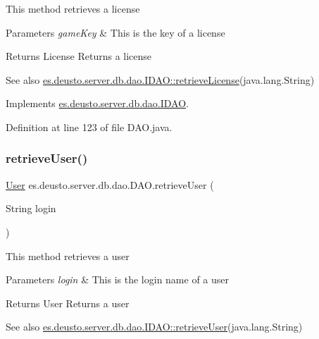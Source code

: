 This method retrieves a license 
\begin{DoxyParams}{Parameters}
{\em game\+Key} & This is the key of a license \\
\hline
\end{DoxyParams}
\begin{DoxyReturn}{Returns}
License Returns a license 
\end{DoxyReturn}
\begin{DoxySeeAlso}{See also}
\hyperlink{interfacees_1_1deusto_1_1server_1_1db_1_1dao_1_1_i_d_a_o_a6a3e25055d4a81c738d1bd73de6ef7da}{es.\+deusto.\+server.\+db.\+dao.\+I\+D\+A\+O\+::retrieve\+License}(java.\+lang.\+String) 
\end{DoxySeeAlso}


Implements \hyperlink{interfacees_1_1deusto_1_1server_1_1db_1_1dao_1_1_i_d_a_o_a6a3e25055d4a81c738d1bd73de6ef7da}{es.\+deusto.\+server.\+db.\+dao.\+I\+D\+AO}.



Definition at line 123 of file D\+A\+O.\+java.

\mbox{\label{classes_1_1deusto_1_1server_1_1db_1_1dao_1_1_d_a_o_a8c316b4c3bf246d00fb2b423a603ebe6}} 
\subsubsection{\texorpdfstring{retrieve\+User()}{retrieveUser()}}
{\footnotesize\ttfamily \hyperlink{classes_1_1deusto_1_1server_1_1db_1_1data_1_1_user}{User} es.\+deusto.\+server.\+db.\+dao.\+D\+A\+O.\+retrieve\+User (\begin{DoxyParamCaption}\item[{String}]{login }\end{DoxyParamCaption})}

This method retrieves a user 
\begin{DoxyParams}{Parameters}
{\em login} & This is the login name of a user \\
\hline
\end{DoxyParams}
\begin{DoxyReturn}{Returns}
User Returns a user 
\end{DoxyReturn}
\begin{DoxySeeAlso}{See also}
\hyperlink{interfacees_1_1deusto_1_1server_1_1db_1_1dao_1_1_i_d_a_o_a19f9b0d0b6f5f80730d6d197deca7dfc}{es.\+deusto.\+server.\+db.\+dao.\+I\+D\+A\+O\+::retrieve\+User}(java.\+lang.\+String) 
\end{DoxySeeAlso}


